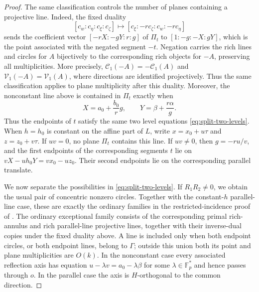 \documentclass[11pt]{article}
\newcommand{\F}{\mathbb F}
\begin{document}
\begin{proof}
The same classification controls the number of planes containing a projective line.  Indeed, the fixed duality
\[
 [c_w:c_\eta:c_\xi:c_\zeta]
 \longmapsto
 [c_\xi:-r c_\zeta:c_w:-r c_\eta]
\]
sends the coefficient vector $[-rX:-gY:r:g]$ of $\Pi_t$ to $[1:-g:-X:gY]$, which is the point associated with the negated segment $-t$. Negation carries the rich lines and circles for $A$ bijectively to
the corresponding rich objects for $-A$, preserving all multiplicities.  More precisely, $\mathcal C_1(-A)=-\mathcal C_1(A)$ and $\mathcal V_1(-A)=\mathcal V_1(A)$, where directions are identified projectively. Thus the same classification applies to plane multiplicity after this duality. Moreover, the nonconstant line above is contained in $\Pi_t$ exactly when
\begin{equation}
 \label{eq:split-dual-parameters}
 X=a_0+\frac{b_0}{r}g,
 \qquad
 Y=\beta+\frac{r\alpha}{g}.
\end{equation}
Thus the endpoints of $t$ satisfy the same two level equations \eqref{eq:split-two-levels}. When $h=h_0$ is constant on the affine part of $L$, write $x=x_0+u\tau$ and $z=z_0+v\tau$. If $uv=0$, no plane $\Pi_t$ contains this line.  If $uv\ne0$, then $g=-ru/v$, and the first endpoints of the corresponding segments $t$ lie on $vX-uh_0Y=vx_0-uz_0$. Their second endpoints lie on the corresponding parallel translate.

We now separate the possibilities in \eqref{eq:split-two-levels}.  If $R_1R_2\ne0$, we obtain the usual pair of concentric nonzero circles. Together with the constant-$h$ parallel-line case, these are exactly the ordinary families in the restricted-incidence proof of \cite{MPPRS}.  The ordinary exceptional family consists of the corresponding primal rich-annulus and rich parallel-line projective lines, together with their inverse-dual copies under the fixed duality above.  A line is included only when both endpoint circles, or both endpoint lines, belong to $\Gamma$; outside this union both its point and plane multiplicities are $O(k)$. In the nonconstant case every associated reflection axis has equation $u-\lambda v=a_0-\lambda\beta$ for some $\lambda\in\F_p^*$ and hence passes through $o$. In the parallel case the axis is $H$-orthogonal to the common direction. 


\end{proof}
\end{document}
